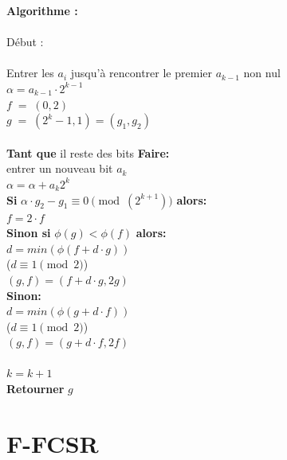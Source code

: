 \documentclass[11pt]{report}
\begin{document}
	 \textbf{Algorithme :} \\\\
	 Début : \\\\
	 Entrer les $a_i$ jusqu'à rencontrer le premier $a_{k-1}$ non nul\\
	 $\alpha = a_{k-1} \cdot 2^{k-1}$\\
	 $f \; = \; (0,2)$\\
	 $g \; = \; (2^k-1,1)=(g_1,g_2)$\\\\
	 \textbf{Tant que} il reste des bits \textbf{Faire:}\\
 entrer un nouveau bit $a_k$ \\ 
 $\alpha = \alpha + a_k2^k$\\
 \textbf{Si} $\alpha \cdot g_2 - g_1 \equiv 0 \pmod(2^{k+1})$ \textbf{alors:}\\ 
 $f = 2 \cdot f$\\
 \textbf{Sinon si} $\phi(g) < \phi(f)$ \textbf{alors:}\\
 $d = min(\phi(f+d \cdot g))$\\
 ($d \equiv 1 \pmod 2$)	 \\
 $(g,f)=(f+d \cdot g, 2g)$\\
 \textbf{Sinon:}\\
 $d = min(\phi(g+d \cdot f))$\\
 ($d \equiv 1 \pmod 2$)	 \\
  $(g,f)=(g+d \cdot f, 2f)$\\\\
  $k=k+1$\\
  \textbf{Retourner} $g$\\
 
\section{F-FCSR}
\end{document}

